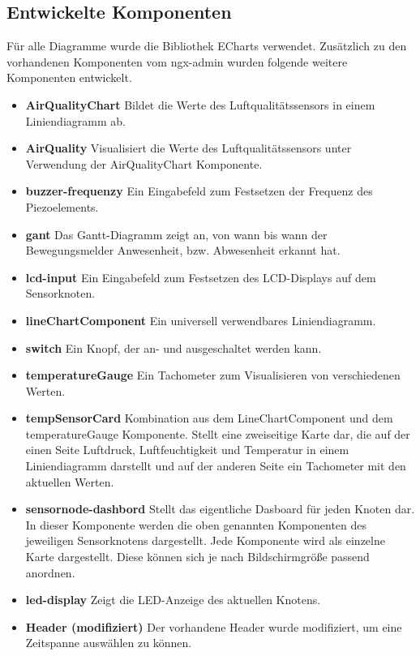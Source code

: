 \subsection{Entwickelte Komponenten}
Für alle Diagramme wurde die Bibliothek ECharts verwendet.
Zusätzlich zu den vorhandenen Komponenten vom ngx-admin wurden folgende weitere Komponenten entwickelt.

\begin{itemize}
 \item \textbf{AirQualityChart} Bildet die Werte des Luftqualitätssensors in einem Liniendiagramm ab.
 \item \textbf{AirQuality} Visualisiert die Werte des Luftqualitätssensors unter Verwendung der AirQualityChart Komponente.
 \item \textbf{buzzer-frequenzy}	Ein Eingabefeld zum Festsetzen der Frequenz des Piezoelements.
 \item \textbf{gant} Das Gantt-Diagramm zeigt an, von wann bis wann der Bewegungsmelder Anwesenheit, bzw. Abwesenheit erkannt hat. 
 \item \textbf{lcd-input} Ein Eingabefeld zum Festsetzen des LCD-Displays auf dem Sensorknoten.
 \item \textbf{lineChartComponent} Ein universell verwendbares Liniendiagramm.
 \item \textbf{switch} Ein Knopf, der an- und ausgeschaltet werden kann.
 \item \textbf{temperatureGauge} Ein Tachometer zum Visualisieren von verschiedenen Werten.
 \item \textbf{tempSensorCard} Kombination aus dem LineChartComponent und dem temperatureGauge Komponente. Stellt eine zweiseitige Karte dar, die auf der einen Seite Luftdruck, Luftfeuchtigkeit und Temperatur in einem Liniendiagramm darstellt und auf der anderen Seite ein Tachometer mit den aktuellen Werten.
 \item \textbf{sensornode-dashbord} Stellt das eigentliche Dasboard für jeden Knoten dar. In dieser Komponente werden die oben genannten Komponenten des jeweiligen Sensorknotens dargestellt. Jede Komponente wird als einzelne Karte dargestellt. Diese können sich je nach Bildschirmgröße passend anordnen.
 \item \textbf{led-display} Zeigt die LED-Anzeige des aktuellen Knotens.
 \item \textbf{Header (modifiziert)} Der vorhandene Header wurde modifiziert, um eine Zeitspanne auswählen zu können.
\end{itemize}

